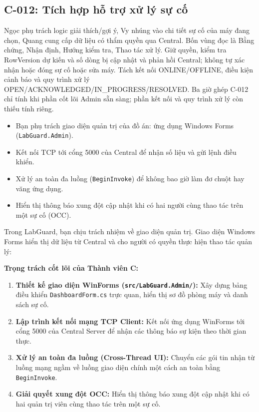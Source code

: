 \documentclass[12pt,a4paper]{article}
\begin{document}
\subsection*{C-012: Tích hợp hỗ trợ xử lý sự cố}
Ngọc phụ trách logic giải thích/gợi ý, Vy nhúng vào chi tiết sự cố của máy đang chọn, Quang cung cấp dữ liệu có thẩm quyền qua Central. Bốn vùng đọc là Bằng chứng, Nhận định, Hướng kiểm tra, Thao tác xử lý. Giữ quyền, kiểm tra RowVersion dự kiến và số dòng bị cập nhật và phản hồi Central; không tự xác nhận hoặc đóng sự cố hoặc sửa máy. Tách kết nối ONLINE/OFFLINE, điều kiện cảnh báo và quy trình xử lý OPEN/ACKNOWLEDGED/IN\_PROGRESS/RESOLVED. Ba giờ ghép C-012 chỉ tính khi phần cốt lõi Admin sẵn sàng; phần kết nối và quy trình xử lý còn thiếu tính riêng.


\begin{summarybox}
\begin{itemize}[leftmargin=1.5em, itemsep=1pt]
  \item Bạn phụ trách giao diện quản trị của đồ án: ứng dụng Windows Forms (\texttt{LabGuard.Admin}).
  \item Kết nối TCP tới cổng 5000 của Central để nhận số liệu và gửi lệnh điều khiển.
  \item Xử lý an toàn đa luồng (\texttt{BeginInvoke}) để không bao giờ làm đơ chuột hay văng ứng dụng.
  \item Hiển thị thông báo xung đột cập nhật khi có hai người cùng thao tác trên một sự cố (OCC).
\end{itemize}
\end{summarybox}

Trong LabGuard, bạn chịu trách nhiệm về giao diện quản trị. Giao diện Windows Forms hiển thị dữ liệu từ Central và cho người có quyền thực hiện thao tác quản lý:

\begin{conceptbox}
\textbf{Trọng trách cốt lõi của Thành viên C:}
\begin{enumerate}
  \item \textbf{Thiết kế giao diện WinForms (\texttt{src/LabGuard.Admin/}):} Xây dựng bảng điều khiển \texttt{DashboardForm.cs} trực quan, hiển thị sơ đồ phòng máy và danh sách sự cố.
  \item \textbf{Lập trình kết nối mạng TCP Client:} Kết nối ứng dụng WinForms tới cổng 5000 của Central Server để nhận các thông báo sự kiện theo thời gian thực.
  \item \textbf{Xử lý an toàn đa luồng (Cross-Thread UI):} Chuyển các gói tin nhận từ luồng mạng ngầm về luồng giao diện chính một cách an toàn bằng \texttt{BeginInvoke}.
  \item \textbf{Giải quyết xung đột OCC:} Hiển thị thông báo xung đột cập nhật khi có hai quản trị viên cùng thao tác trên một sự cố.
\end{enumerate}
\end{conceptbox}
\end{document}
